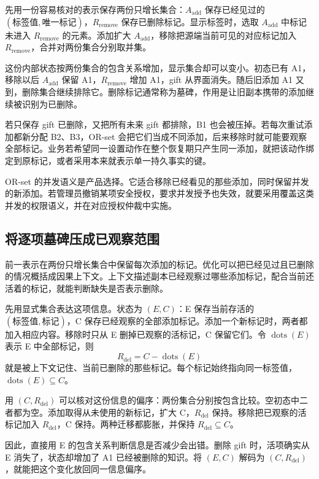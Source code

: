 先用一份容易核对的表示保存两份只增长集合：$A_{\mathrm{add}}$ 保存已经见过的 $(\text{标签值},\text{唯一标记})$，$R_{\mathrm{remove}}$ 保存已删除标记。显示标签时，选取 $A_{\mathrm{add}}$ 中标记未进入 $R_{\mathrm{remove}}$ 的元素。添加扩大 $A_{\mathrm{add}}$，移除把源端当前可见的对应标记加入 $R_{\mathrm{remove}}$，合并对两份集合分别取并集。

这份内部状态按两份集合的包含关系增加，显示集合却可以变小。初态已有 A1，移除以后 $A_{\mathrm{add}}$ 保留 A1，$R_{\mathrm{remove}}$ 增加 A1，gift 从界面消失。随后旧添加 A1 又到，删除集合继续排除它。删除标记通常称为墓碑，作用是让旧副本携带的添加继续被识别为已删除。

若只保存 gift 已删除，又把所有未来 gift 都排除，B1 也会被压掉。若每次重试添加都新分配 B2、B3，OR-set 会把它们当成不同添加，后来移除时就可能要观察全部标记。业务若希望同一设置动作在整个恢复期只产生同一添加，就把该动作绑定到原标记，或者采用本来就表示单一持久事实的键。

OR-set 的并发语义是产品选择。它适合移除已经看见的那些添加，同时保留并发的新添加。若管理员撤销某项安全授权，要求并发授予也失效，就要采用覆盖这类并发的权限语义，并在对应授权仲裁中实施。

\subsection*{将逐项墓碑压成已观察范围}

前一表示在两份只增长集合中保留每次添加的标记。优化可以把已经见过且已删除的情况概括成因果上下文。上下文描述副本已经观察过哪些添加标记，配合当前还活着的标记，就能判断缺失是否表示删除。

先用显式集合表达这项信息。状态为 $(E,C)$：E 保存当前存活的 $(\text{标签值},\text{标记})$，C 保存已经观察的全部添加标记。添加一个新标记时，两者都加入相应内容。移除时只从 E 删掉已观察的活标记，C 保留它们。令 $\operatorname{dots}(E)$ 表示 E 中全部标记，则
\[
  R_{\mathrm{del}}=C-\operatorname{dots}(E)
\]
就是被上下文记住、当前已删除的那些标记。每个标记始终指向同一标签值，$\operatorname{dots}(E)\subseteq C$。

用 $(C,R_{\mathrm{del}})$ 可以核对这份信息的偏序：两份集合分别按包含比较。空初态中二者都为空。添加取得从未使用的新标记，扩大 C，$R_{\mathrm{del}}$ 保持。移除把已观察的活标记加入 $R_{\mathrm{del}}$，C 保持。两种迁移都膨胀，并保持 $R_{\mathrm{del}}\subseteq C$。

因此，直接用 E 的包含关系判断信息是否减少会出错。删除 gift 时，活项确实从 E 消失了，状态却增加了 A1 已经被删除的知识。将 $(E,C)$ 解码为 $(C,R_{\mathrm{del}})$，就能把这个变化放回同一信息偏序。

